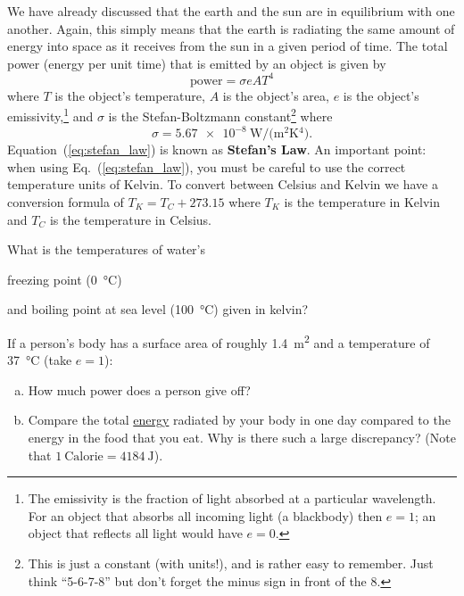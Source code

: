         We have already discussed that the earth and the sun are in equilibrium with one another. Again, this simply means that the earth is radiating the same amount of energy into space as it receives from the sun in a given period of time. The total power (energy per unit time) that is emitted by an object is given by
        \begin{equation}
            \text{power} = \sigma e A T^4
            \label{eq:stefan_law}
        \end{equation}
        where $T$ is the object's temperature, $A$ is the object's area, $e$ is the object's emissivity,\footnote
        {
            The emissivity is the fraction of light absorbed at a particular wavelength. For an object that absorbs all incoming light (a blackbody) then $e = 1$; an object that reflects all light would have $e = 0$.
        } 
        and $\sigma$ is the Stefan-Boltzmann constant\footnote
        {
            This is just a constant (with units!), and is rather easy to remember. Just think ``5-6-7-8'' but don't forget the minus sign in front of the 8.
        } 
        where 
        \begin{equation}
            \sigma = \SI[per-mode=fraction]{5.67e-8}{\watt \per (\meter^2  \kelvin^4)}. 
        \end{equation}
        Equation~(\ref{eq:stefan_law}) is known as \textbf{Stefan's Law}. An important point: when using Eq.~(\ref{eq:stefan_law}), you must be careful to use the correct temperature units of Kelvin. To convert between Celsius and Kelvin we have a conversion formula of $T_K = T_C + 273.15$ where $T_K$ is the temperature in Kelvin and $T_C$ is the temperature in Celsius.

        \begin{exercise}
            What is the temperatures of water's
            \begin{enumerate*}[(a)]
                \item  freezing point (\SI{0}{\celsius})
                \item and boiling point at sea level (\SI{100}{\celsius})
                given in kelvin?
            \end{enumerate*}
        \label{ex:kelvin}
        \end{exercise}

        \begin{exercise}
        If a person's body has a surface area of roughly \SI{1.4}{\meter^2} and a  temperature of \SI{37}{\celsius} (take $e = 1$):
            \begin{enumerate}[(a)]
                \item How much power does a person give off? 
                \item Compare the total \underline{energy} radiated by your body in one day compared to the energy in the food that you eat. Why is there such a large discrepancy? (Note that $\SI{1}{\text{Calorie}}=\SI{4184}{\joule}$).
            \end{enumerate}
            \label{ex:humans}
        \end{exercise}

